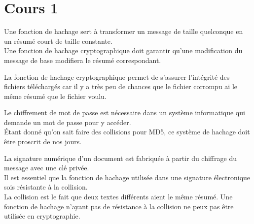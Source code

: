 \section{Cours 1}
Une fonction de hachage sert à transformer un message de taille quelconque en un résumé court de taille constante.\\
Une fonction de hachage cryptographique doit garantir qu'une modification du message de base modifiera le résumé
correspondant.

La fonction de hachage cryptographique permet de s'assurer l'intégrité des fichiers téléchargés car il y a très peu de
chances que le fichier corrompu ai le même résumé que le fichier voulu.

Le chiffrement de mot de passe est nécessaire dans un système informatique qui demande un mot de passe pour y accéder.\\
Étant donné qu'on sait faire des collisions pour MD5, ce système de hachage doit être proscrit de nos jours.

La signature numérique d'un document est fabriquée à partir du chiffrage du message avec une clé privée.\\
Il est essentiel que la fonction de hachage utilisée dans une signature électronique sois résistante à la collision.\\
La collision est le fait que deux textes différents aient le même résumé. Une fonction de hachage n'ayant pas de
résistance à la collision ne peux pas être utilisée en cryptographie.
